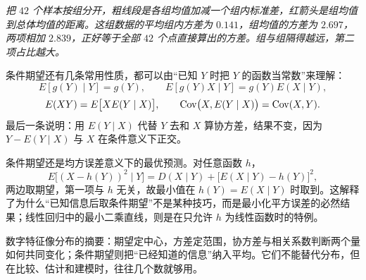 \begin{center}
\par\vspace{2pt}
{\footnotesize\itshape 把 $42$ 个样本按组分开，粗线段是各组均值加减一个组内标准差，红箭头是组均值到总体均值的距离。这组数据的平均组内方差为 $0.141$，组均值的方差为 $2.697$，两项相加 $2.839$，正好等于全部 $42$ 个点直接算出的方差。组与组隔得越远，第二项占比越大。}
\end{center}

条件期望还有几条常用性质，都可以由“已知 $Y$ 时把 $Y$ 的函数当常数”来理解：
\[
E[g(Y)\mid Y]=g(Y),\qquad
E[g(Y)X\mid Y]=g(Y)E(X\mid Y),
\]
\[
E(XY)=E\bigl[XE(Y\mid X)\bigr],\qquad
\operatorname{Cov}\bigl(X,E(Y\mid X)\bigr)=\operatorname{Cov}(X,Y).
\]
最后一条说明：用 $E(Y\mid X)$ 代替 $Y$ 去和 $X$ 算协方差，结果不变，因为 $Y-E(Y\mid X)$ 与 $X$ 在条件意义下正交。

条件期望还是均方误差意义下的最优预测。对任意函数 $h$，
\[
E\bigl[(X-h(Y))^2\mid Y\bigr]
=D(X\mid Y)+\bigl[E(X\mid Y)-h(Y)\bigr]^2,
\]
两边取期望，第一项与 $h$ 无关，故最小值在 $h(Y)=E(X\mid Y)$ 时取到。这解释了为什么“已知信息后取条件期望”不是某种技巧，而是最小化平方误差的必然结果；线性回归中的最小二乘直线，则是在只允许 $h$ 为线性函数时的特例。

数字特征像分布的摘要：期望定中心，方差定范围，协方差与相关系数判断两个量如何共同变化；条件期望则把“已经知道的信息”纳入平均。它们不能替代分布，但在比较、估计和建模时，往往几个数就够用。
\newpage


